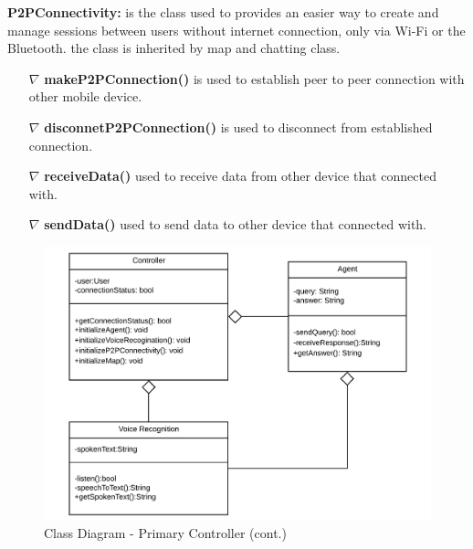 \documentclass{scrreprt}
\begin{document}
\textbf{P2PConnectivity:} is the class used to  provides an easier way to create and manage sessions between users without internet connection, only via Wi-Fi or the Bluetooth. the class is inherited by map and chatting class.

\begin{itemize}


\item[$\nabla$] \textbf{makeP2PConnection()} is used to establish peer to peer connection with other mobile device.
\item[$\nabla$] \textbf{disconnetP2PConnection()} is used to disconnect from established connection.
\item[$\nabla$] \textbf{receiveData()} used to receive data from other device that connected with.
\item[$\nabla$] \textbf{sendData()} used to send data to other device that  connected with.
\end{itemize}
\clearpage

\begin{figure}[ht!]
    \includegraphics[width=\textwidth]{img2/ClassDClass1DIV.pdf}
    \caption{Class Diagram - Primary Controller (cont.)}
    \label{fig:classdiagram2}
\end{figure}

\end{document}
